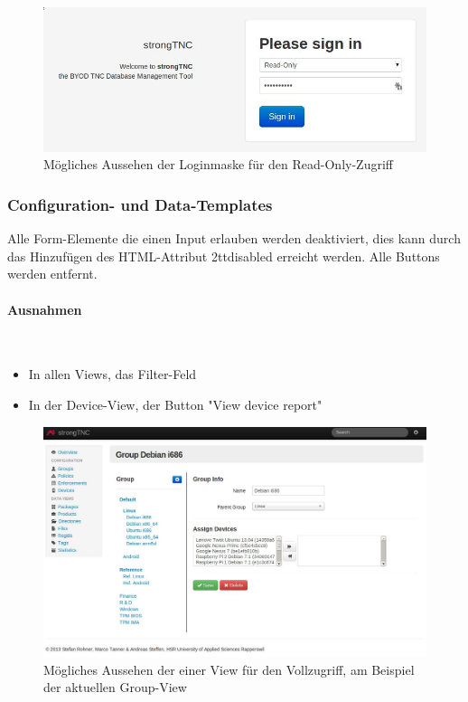 \begin{figure}[H]
	\centering
	\includegraphics[width=\textwidth]{images/rollen-konzept/login-read-only.jpg}
	\caption{Mögliches Aussehen der Loginmaske für den Read-Only-Zugriff}
\end{figure}

\subsubsection{Configuration- und Data-Templates}

Alle Form-Elemente die einen Input erlauben werden deaktiviert, dies kann durch das 
Hinzufügen des HTML-Attribut \text2tt{disabled} erreicht werden. Alle Buttons werden entfernt.

\paragraph{Ausnahmen} \hspace{0pt} \\
\begin{itemize}
    \item In allen Views, das Filter-Feld
    \item In der Device-View, der Button "View device report"
\end{itemize}

\begin{figure}[H]
	\centering
	\includegraphics[width=\textwidth]{images/rollen-konzept/group-view-admin.jpg}
	\caption{Mögliches Aussehen der einer View für den Vollzugriff, am Beispiel der aktuellen Group-View}
\end{figure}

